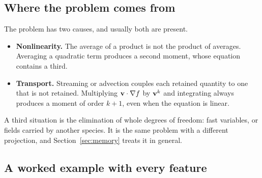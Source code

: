 \subsection{Where the problem comes from}

The problem has two causes, and usually both are present.
\begin{itemize}
  \item \textbf{Nonlinearity.} The average of a product is not the product of
    averages. Averaging a quadratic term produces a second moment, whose
    equation contains a third.
  \item \textbf{Transport.} Streaming or advection couples each retained
    quantity to one that is not retained. Multiplying
    $\mathbf{v}\cdot\nabla f$ by $\mathbf{v}^k$ and integrating always produces a moment
    of order $k+1$, even when the equation is linear.
\end{itemize}
A third situation is the elimination of whole degrees of freedom: fast
variables, or fields carried by another species. It is the same problem with
a different projection, and Section~\ref{sec:memory} treats it in general.

\subsection{A worked example with every feature}
\label{sec:fastslow}

